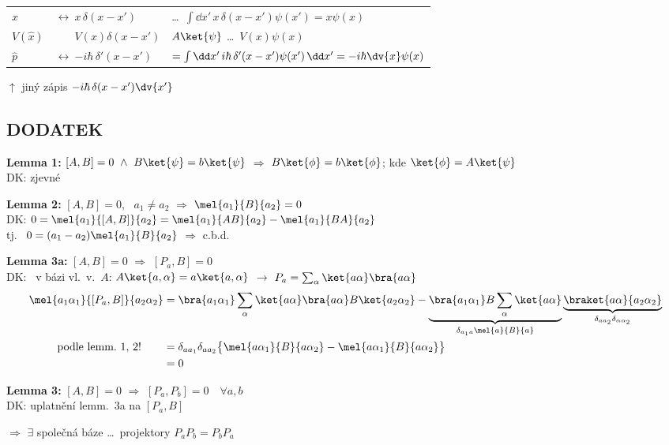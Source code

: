 \begin{priklad}[PŘ]
\begin{tabular}{lll}
$\hat x$ & $\leftrightarrow\ x\,\delta(x - x')$ & \dots\ $\int\dd x'\,x\,\delta(x - x')\psi(x') = x\psi(x)$ \\[2pt]
$V(\hat x)$ & $\phantom{\leftrightarrow}\ V(x)\delta(x - x')$ & $A\ket{\psi}$ \dots\ $V(x)\psi(x)$ \\[2pt]
$\hat p$ & $\leftrightarrow\ {-i\hbar}\,\delta'(x - x')$ & $= \int\dd x'\,i\hbar\,\delta'(x - x')\psi(x')\,\dd x' = -i\hbar\dv{x}\psi(x)$
\end{tabular}

\quad $\uparrow$ jiný zápis $-i\hbar\,\delta(x - x')\dv{x'}$

\end{priklad}

\subsection*{DODATEK}


\textbf{Lemma 1:} \quad $[A,B] = 0\ \wedge\ B\ket{\psi} = b\ket{\psi}$ \quad $\Rightarrow$ \quad $B\ket{\phi} = b\ket{\phi}$; kde $\ket{\phi} = A\ket{\psi}$ \\
\quad DK: zjevné

\textbf{Lemma 2:} \quad $[A,B] = 0$, \ $a_1\neq a_2$ \quad $\Rightarrow$ \quad $\mel{a_1}{B}{a_2} = 0$ \\
\quad DK: \quad $0 = \mel{a_1}{[A,B]}{a_2} = \mel{a_1}{AB}{a_2} - \mel{a_1}{BA}{a_2}$ \\
\quad\phantom{DK:} tj. \ $0 = (a_1 - a_2)\mel{a_1}{B}{a_2}$ \quad $\Rightarrow$ c.b.d.

\textbf{Lemma 3a:} \quad $[A,B] = 0$ \quad $\Rightarrow$ \quad $[P_a,B] = 0$ \\
\quad DK: \ v bázi vl.\ v.\ $A$: \quad $A\ket{a,\alpha} = a\ket{a,\alpha}$ $\to$ $P_a = \sum_\alpha\ket{a\alpha}\bra{a\alpha}$
\begin{align*}
  \mel{a_1\alpha_1}{[P_a,B]}{a_2\alpha_2} &= \bra{a_1\alpha_1}\sum_\alpha\ket{a\alpha}\bra{a\alpha}B\ket{a_2\alpha_2}
   - \underbrace{\bra{a_1\alpha_1}B\sum_\alpha\ket{a\alpha}}_{\delta_{a_1a}\mel{a}{B}{a}}\underbrace{\braket{a\alpha}{a_2\alpha_2}}_{\delta_{aa_2}\delta_{\alpha\alpha_2}} \\
  \text{podle lemm.\ 1, 2!}\qquad &= \delta_{aa_1}\delta_{aa_2}\big\{\mel{a\alpha_1}{B}{a\alpha_2} - \mel{a\alpha_1}{B}{a\alpha_2}\big\} \\
  &= 0
\end{align*}

\textbf{Lemma 3:} \quad $[A,B] = 0$ \quad $\Rightarrow$ \quad $[P_a,P_b] = 0\quad\forall a,b$ \\
\quad DK: uplatnění lemm.\ 3a na $[P_a,B]$

$\Rightarrow$ $\exists$ společná báze \dots\ projektory $P_aP_b = P_bP_a$

